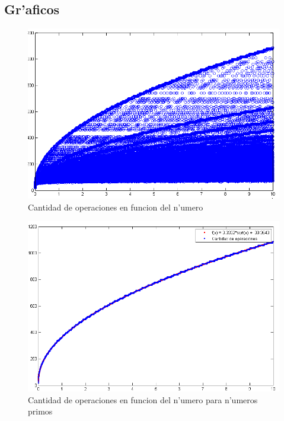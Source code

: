 \subsection{Gr'aficos}
\begin{figure}[H]
\centering
\includegraphics[scale=0.8]{../../codigo/ejercicio1/benchmark/graficos/todos_los_numeros/graficosTodos.png}
\caption{Cantidad de operaciones en funcion del n'umero}
\end{figure}

\begin{figure}[H]
\centering
\includegraphics[scale=0.8]{../../codigo/ejercicio1/benchmark/graficos/primos/graficoPrimos.png}
\caption{Cantidad de operaciones en funcion del n'umero para n'umeros primos}
\end{figure}

